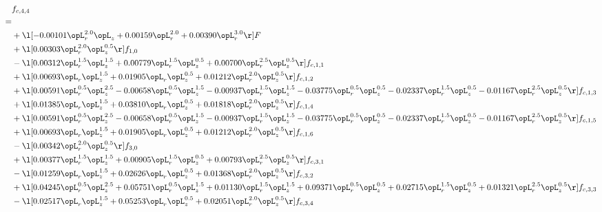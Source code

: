 \begin{alignat}{2} 
\label{eq:f_44_1} 
& f_{c,4,4} \nonumber \\ 
 = \\ 
& + \l[  -0.00101 \opL_r^{2.0} \opL_z +  0.00159 \opL_r^{2.0} +  0.00390 \opL_r^{3.0}  \r] F \nonumber \\ 
& + \l[  0.00303 \opL_r^{2.0} \opL_z^{0.5}  \r] f_{1,0} \nonumber \\ 
& - \l[  0.00312 \opL_r^{1.5} \opL_z^{1.5} +  0.00779 \opL_r^{1.5} \opL_z^{0.5} +  0.00700 \opL_r^{2.5} \opL_z^{0.5}  \r] f_{c,1,1} \nonumber \\ 
& + \l[  0.00693 \opL_r \opL_z^{1.5} +  0.01905 \opL_r \opL_z^{0.5} +  0.01212 \opL_r^{2.0} \opL_z^{0.5}  \r] f_{c,1,2} \nonumber \\ 
& + \l[  0.00591 \opL_r^{0.5} \opL_z^{2.5}   -0.00658 \opL_r^{0.5} \opL_z^{1.5}   -0.00937 \opL_r^{1.5} \opL_z^{1.5}   -0.03775 \opL_r^{0.5} \opL_z^{0.5}   -0.02337 \opL_r^{1.5} \opL_z^{0.5}   -0.01167 \opL_r^{2.5} \opL_z^{0.5}  \r] f_{c,1,3} \nonumber \\ 
& + \l[  0.01385 \opL_r \opL_z^{1.5} +  0.03810 \opL_r \opL_z^{0.5} +  0.01818 \opL_r^{2.0} \opL_z^{0.5}  \r] f_{c,1,4} \nonumber \\ 
& + \l[  0.00591 \opL_r^{0.5} \opL_z^{2.5}   -0.00658 \opL_r^{0.5} \opL_z^{1.5}   -0.00937 \opL_r^{1.5} \opL_z^{1.5}   -0.03775 \opL_r^{0.5} \opL_z^{0.5}   -0.02337 \opL_r^{1.5} \opL_z^{0.5}   -0.01167 \opL_r^{2.5} \opL_z^{0.5}  \r] f_{c,1,5} \nonumber \\ 
& + \l[  0.00693 \opL_r \opL_z^{1.5} +  0.01905 \opL_r \opL_z^{0.5} +  0.01212 \opL_r^{2.0} \opL_z^{0.5}  \r] f_{c,1,6} \nonumber \\ 
& - \l[  0.00342 \opL_r^{2.0} \opL_z^{0.5}  \r] f_{3,0} \nonumber \\ 
& + \l[  0.00377 \opL_r^{1.5} \opL_z^{1.5} +  0.00905 \opL_r^{1.5} \opL_z^{0.5} +  0.00793 \opL_r^{2.5} \opL_z^{0.5}  \r] f_{c,3,1} \nonumber \\ 
& - \l[  0.01259 \opL_r \opL_z^{1.5} +  0.02626 \opL_r \opL_z^{0.5} +  0.01368 \opL_r^{2.0} \opL_z^{0.5}  \r] f_{c,3,2} \nonumber \\ 
& + \l[  0.04245 \opL_r^{0.5} \opL_z^{2.5} +  0.05751 \opL_r^{0.5} \opL_z^{1.5} +  0.01130 \opL_r^{1.5} \opL_z^{1.5} +  0.09371 \opL_r^{0.5} \opL_z^{0.5} +  0.02715 \opL_r^{1.5} \opL_z^{0.5} +  0.01321 \opL_r^{2.5} \opL_z^{0.5}  \r] f_{c,3,3} \nonumber \\ 
& - \l[  0.02517 \opL_r \opL_z^{1.5} +  0.05253 \opL_r \opL_z^{0.5} +  0.02051 \opL_r^{2.0} \opL_z^{0.5}  \r] f_{c,3,4} \nonumber \\ 

\end{alignat}
